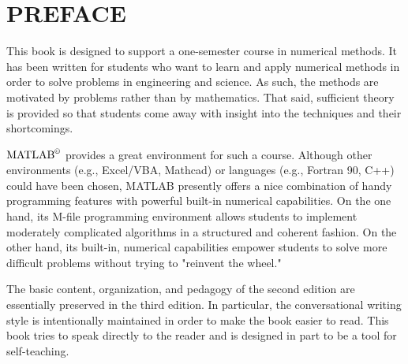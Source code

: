 \documentclass[../main.tex]{subfiles}
\begin{document}
\chapter*{PREFACE}
\label{cha:cha_P_1}

This book is designed to support a one-semester course in numerical methods. It has been
written for students who want to learn and apply numerical methods in order to solve problems in engineering and science. As such, the methods are motivated by problems rather
than by mathematics. That said, sufficient theory is provided so that students come away
with insight into the techniques and their shortcomings.


$\text{MATLAB}^\copyright$  provides a great environment for such a course. Although other environments (e.g., Excel/VBA, Mathcad) or languages (e.g., Fortran 90, C++) could have
been chosen, MATLAB presently offers a nice combination of handy programming features with powerful built-in numerical capabilities. On the one hand, its M-file programming environment allows students to implement moderately complicated algorithms in a
structured and coherent fashion. On the other hand, its built-in, numerical capabilities
empower students to solve more difficult problems without trying to "reinvent the wheel."


The basic content, organization, and pedagogy of the second edition are essentially
preserved in the third edition. In particular, the conversational writing style is intentionally
maintained in order to make the book easier to read. This book tries to speak directly to the
reader and is designed in part to be a tool for self-teaching.
\end{document}
